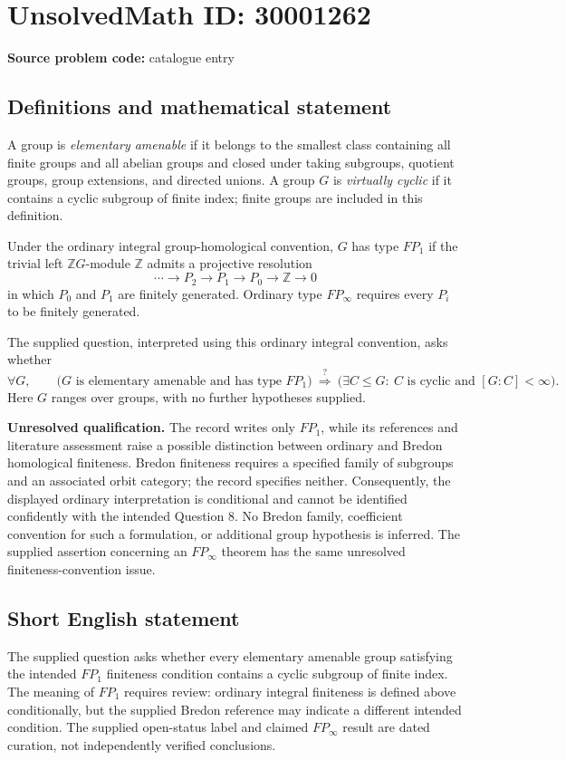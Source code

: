 \documentclass[11pt]{article}
\newcommand{\Z}{\mathbb{Z}}
\begin{document}
\section*{UnsolvedMath ID: 30001262}
\textbf{Source problem code:} catalogue entry
\subsection{Definitions and mathematical statement}
A group is \emph{elementary amenable} if it belongs to the smallest class containing all finite groups and all abelian groups and closed under taking subgroups, quotient groups, group extensions, and directed unions. A group \(G\) is \emph{virtually cyclic} if it contains a cyclic subgroup of finite index; finite groups are included in this definition.

Under the ordinary integral group-homological convention, \(G\) has type \(FP_1\) if the trivial left \(\Z G\)-module \(\Z\) admits a projective resolution
\[
\cdots \longrightarrow P_2\longrightarrow P_1\longrightarrow P_0\longrightarrow \Z\longrightarrow 0
\]
in which \(P_0\) and \(P_1\) are finitely generated. Ordinary type \(FP_\infty\) requires every \(P_i\) to be finitely generated.

The supplied question, interpreted using this ordinary integral convention, asks whether
\[
\forall G,\qquad
\bigl(G\text{ is elementary amenable and has type }FP_1\bigr)
\ \stackrel{?}{\Longrightarrow}\ 
\bigl(\exists C\leq G:\ C\text{ is cyclic and }[G:C]<\infty\bigr).
\]
Here \(G\) ranges over groups, with no further hypotheses supplied.

\textbf{Unresolved qualification.} The record writes only \(FP_1\), while its references and literature assessment raise a possible distinction between ordinary and Bredon homological finiteness. Bredon finiteness requires a specified family of subgroups and an associated orbit category; the record specifies neither. Consequently, the displayed ordinary interpretation is conditional and cannot be identified confidently with the intended Question 8. No Bredon family, coefficient convention for such a formulation, or additional group hypothesis is inferred. The supplied assertion concerning an \(FP_\infty\) theorem has the same unresolved finiteness-convention issue.
\subsection{Short English statement}
The supplied question asks whether every elementary amenable group satisfying the intended \(FP_1\) finiteness condition contains a cyclic subgroup of finite index. The meaning of \(FP_1\) requires review: ordinary integral finiteness is defined above conditionally, but the supplied Bredon reference may indicate a different intended condition. The supplied open-status label and claimed \(FP_\infty\) result are dated curation, not independently verified conclusions.
\end{document}
